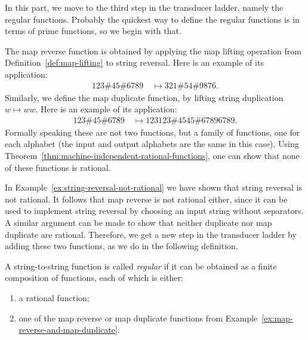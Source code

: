 In this part, we move to the third step in the transducer ladder, namely the  regular functions. Probably the quickest way to define the regular functions is in terms of prime functions, so we begin with that. 

\begin{myexample}\label{ex:map-reverse-and-map-duplicate}
    The map reverse function is obtained by applying the map lifting operation from Definition~\ref{def:map-lifting} to string reversal. Here is an example of its application:
    \begin{align*}
    123 \# 45 \# 6789 \quad \mapsto 321 \# 54 \# 9876.
    \end{align*}
    Similarly, we define the map duplicate function, by lifting string duplication $w \mapsto ww$. Here is an example of its application:
    \begin{align*}
    123 \# 45 \# 6789 \quad \mapsto 123123 \# 4545 \# 67896789.
    \end{align*}
    Formally speaking these are not two functions, but a family of functions, one for each alphabet (the input and output alphabets are the same in this case). Using Theorem~\ref{thm:machine-independent-rational-functions}, one can show that none of these functions is rational. 
\end{myexample}

In Example~\ref{ex:string-reversal-not-rational} we have shown that string reversal is not rational. It follows that map reverse is not rational either, since it can be used to implement string reversal by choosing an input string without separators. A similar argument can be made to show that neither duplicate nor map duplicate are rational. Therefore, we get a new step in the transducer ladder by adding these two functions, as we do in the following definition.

\begin{definition}\label{def:regular-functions}
    A string-to-string function is called \emph{regular} if it can be obtained as a finite composition of functions, each of which is either:
    \begin{enumerate}
        \item a rational function;
        \item one of the map reverse or map duplicate functions from Example~\ref{ex:map-reverse-and-map-duplicate}.
    \end{enumerate}
\end{definition}

